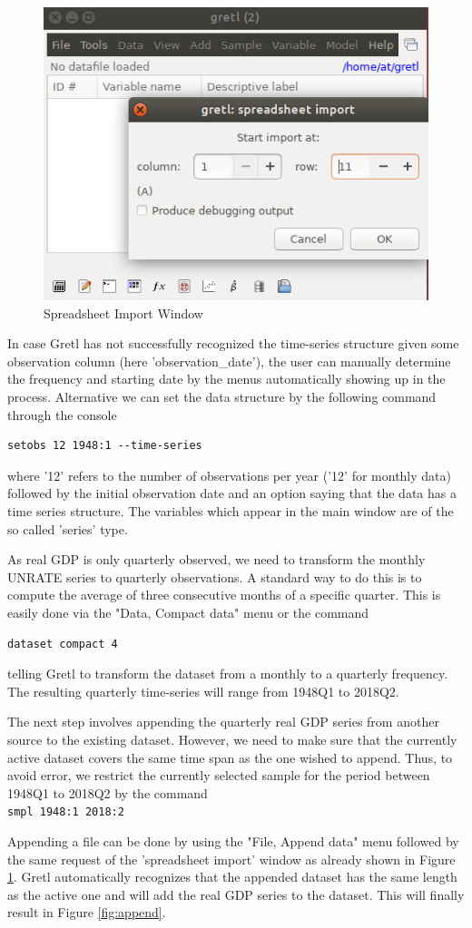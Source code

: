 \documentclass[11pt]{article}
\begin{document}
\begin{figure}[!h]
	\centering
	\includegraphics[width=.42\textwidth]{../figures/open_file}
	\caption{Spreadsheet Import Window}
	\label{fig:load}
\end{figure}

In case Gretl has not successfully recognized the time-series structure given some observation column (here 'observation\_date'), the user can manually determine the frequency and starting date by the menus automatically showing up in the process. Alternative we can set the data structure by the following command through the console
\begin{verbatim}
setobs 12 1948:1 --time-series
\end{verbatim}
where '12' refers to the number of observations per year ('12' for monthly data) followed by the initial observation date and an option saying that the data has a time series structure. The variables which appear in the main window are of the so called 'series' type.

As real GDP is only quarterly observed, we need to transform the monthly UNRATE series to quarterly observations. A standard way to do this is to compute the average of three consecutive months of a specific quarter. This is easily done via the "Data, Compact data" menu or the command
\begin{verbatim}
dataset compact 4
\end{verbatim}
telling Gretl to transform the dataset from a monthly to a quarterly frequency. The resulting quarterly time-series will range from 1948Q1 to 2018Q2.

The next step involves appending the quarterly real GDP series from another source to the existing dataset. However, we need to make sure that the currently active dataset covers the same time span as the one wished to append. Thus, to avoid error, we restrict the currently selected sample for the period between 1948Q1 to 2018Q2 by the command\\
\texttt{smpl 1948:1 2018:2}

Appending a file can be done by using the "File, Append data" menu followed by the same request of the 'spreadsheet import' window as already shown in Figure \ref{fig:load}. Gretl automatically recognizes that the appended dataset has the same length as the active one and will add the real GDP series to the dataset. This will finally result in Figure \ref{fig:append}.
\end{document}

